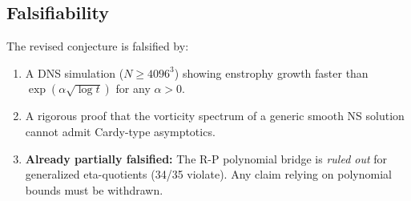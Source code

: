 \subsection{Falsifiability}

The revised conjecture is falsified by:
\begin{enumerate}
  \item A DNS simulation ($N \geq 4096^3$) showing enstrophy growth faster than $\exp(\alpha\sqrt{\log t})$ for any $\alpha > 0$.
  \item A rigorous proof that the vorticity spectrum of a generic smooth NS solution cannot admit Cardy-type asymptotics.
  \item \textbf{Already partially falsified:} The R-P polynomial bridge is \emph{ruled out} for generalized eta-quotients (34/35 violate). Any claim relying on polynomial bounds must be withdrawn.
\end{enumerate}
